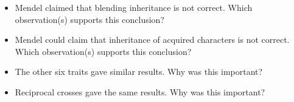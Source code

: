 \begin{frame}
    \begin{itemize}[<+->]
        \item Mendel claimed that blending inheritance is not correct. Which
            observation(s) supports this conclusion?

        \item Mendel could claim that inheritance of acquired characters is not
            correct. Which observation(s) supports this conclusion?

        \item The other six traits gave similar results. Why was this
            important?

        \item Reciprocal crosses gave the same results. Why was this important?
    \end{itemize}
\end{frame}

